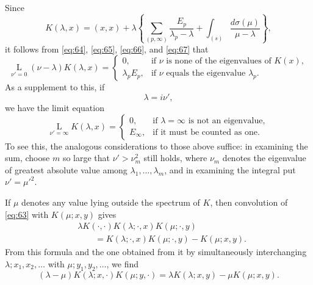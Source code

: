 \documentclass[b5paper,twoside]{article}
\newcommand{\originalpage}[1]{\phantomsection\label{origpage:#1}}
\begin{document}
\originalpage{192}
Since
\[
  K(\lambda,x)=(x,x)+\lambda
  \left\{
    \sum_{(p,\infty)}\frac{E_p}{\lambda_p-\lambda}
    +\int_{(s)}\frac{d\sigma(\mu)}{\mu-\lambda}
  \right\},
\]
it follows from \eqref{eq:64}, \eqref{eq:65}, \eqref{eq:66}, and
\eqref{eq:67} that
\begin{equation}
\tag{68}\label{eq:68}
  \mathop{\mathrm{L}}\limits_{\nu'=0}
  (\nu-\lambda)K(\lambda,x)
  =\begin{cases}
     0, & \text{if $\nu$ is none of the eigenvalues of $K(x)$},\\
     \lambda_pE_p, & \text{if $\nu$ equals the eigenvalue $\lambda_p$}.
   \end{cases}
\end{equation}
As a supplement to this, if
\[
  \lambda=i\nu',
\]
we have the limit equation
\begin{equation}
\tag{69}\label{eq:69}
  \mathop{\mathrm{L}}\limits_{\nu'=\infty}K(\lambda,x)
  =\begin{cases}
     0, & \text{if $\lambda=\infty$ is not an eigenvalue},\\
     E_\infty, & \text{if it must be counted as one}.
   \end{cases}
\end{equation}
To see this, the analogous considerations to those above suffice: in
examining the sum, choose $m$ so large that $\nu'>\nu_m^2$ still holds, where
$\nu_m$ denotes the eigenvalue of greatest absolute value among
$\lambda_1,\ldots,\lambda_m$, and in examining the integral put
$\nu'=\mu'^2$.

If $\mu$ denotes any value lying outside the spectrum of $K$, then
convolution of \eqref{eq:63} with $K(\mu;x,y)$ gives
\[
\begin{aligned}
  &\lambda K(\mathord{\cdot},\mathord{\cdot})
  K(\lambda;\mathord{\cdot},x)K(\mu;\mathord{\cdot},y)\\
  &\qquad
  =K(\lambda;\mathord{\cdot},x)K(\mu;\mathord{\cdot},y)-K(\mu;x,y).
\end{aligned}
\]
From this formula and the one obtained from it by simultaneously
interchanging $\lambda;x_1,x_2,\ldots$ with
$\mu;y_1,y_2,\ldots$, we find
\begin{equation}
\tag{70}\label{eq:70}
  (\lambda-\mu)K(\lambda;x,\mathord{\cdot})
  K(\mu;y,\mathord{\cdot})
  =\lambda K(\lambda;x,y)-\mu K(\mu;x,y).
\end{equation}
\end{document}
